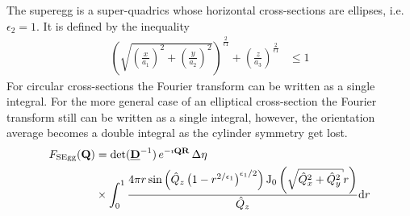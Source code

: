 The superegg is a super-quadrics whose horizontal cross-sections are ellipses, i.e. $\epsilon_2=1$. It is defined by the inequality \cite{WeisssteinSuperEgg}
\begin{align}
\label{eq:superegg_implicit}
   \left(\sqrt{\left(\frac{x}{a_1}\right)^2+\left(\frac{y}{a_2}\right)^2}\right)^{\frac{2}{\epsilon1}} + \left(\frac{z}{a_3}\right)^{\frac{2}{\epsilon1}} & \leq 1
\end{align}
For circular cross-sections the Fourier transform \cite{Maric2017} can be written as a single integral. For the more general case of an elliptical cross-section the Fourier transform still can be written as a single integral, however, the orientation average becomes a double integral as the cylinder symmetry get lost.
\begin{align}
F_\mathrm{SEgg}(\B{Q}) &=
\det(\M{D}^{-1})\, e^{-\imath\B{QR}}\, \Delta\eta\,  \nonumber \\
 &\times \int_0^1 \frac{4 \pi  r \sin \left(\hat{Q}_z \left(1-r^{2/\epsilon_1}\right)^{\epsilon_1/2}\right) \operatorname{J}_0\left(\sqrt{\hat{Q}_x^2+\hat{Q}_y^2}
   r\right)}{\hat{Q}_z} \mathrm{d}r
\end{align}

\clearpage
